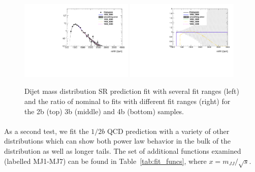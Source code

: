 \begin{figure}[htbp!]
\begin{center}
\includegraphics[angle=270, width=0.48\textwidth]{figures/boosted/Syst_Smooth/smoothFuncRangeCompare_44_comp.pdf}
\includegraphics[angle=270, width=0.48\textwidth]{figures/boosted/Syst_Smooth/smoothFuncRangeCompare_44_comp_ratio.pdf} \\
\caption{Dijet mass distribution SR prediction fit with several fit ranges (left) and the ratio of nominal to fits with different fit ranges (right)  for the 2b (top) 3b (middle) and 4b (bottom) samples. }
\label{fig:qcd_fit_range_sys_ratio-scaled}
\end{center}
\end{figure}

\paragraph{}
As a second test, we fit the $1/2b$ QCD prediction with a variety of other distributions which can show both power law behavior in the bulk of the distribution as well as longer tails.  The set of additional functions examined (labelled MJ1-MJ7) can be found in Table~\ref{tab:fit_funcs}, where $x = m_{JJ} / \sqrt{s}$.

